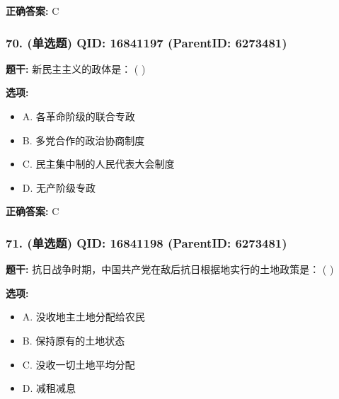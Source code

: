 \documentclass[12pt,UTF8]{ctexart}
\begin{document}
\textbf{正确答案:}
C

\vspace{0.3em}\hrulefill\vspace{0.7em}

\subsubsection*{70. (单选题) \small QID: 16841197 (ParentID: 6273481)}

\textbf{题干:}
新民主主义的政体是： ( )



\textbf{选项:}
\begin{itemize}[leftmargin=*]

  \item A. 各革命阶级的联合专政

  \item B. 多党合作的政治协商制度

  \item C. 民主集中制的人民代表大会制度

  \item D. 无产阶级专政

\end{itemize}

\textbf{正确答案:}
C

\vspace{0.3em}\hrulefill\vspace{0.7em}

\subsubsection*{71. (单选题) \small QID: 16841198 (ParentID: 6273481)}

\textbf{题干:}
抗日战争时期，中国共产党在敌后抗日根据地实行的土地政策是： ( )



\textbf{选项:}
\begin{itemize}[leftmargin=*]

  \item A. 没收地主土地分配给农民

  \item B. 保持原有的土地状态

  \item C. 没收一切土地平均分配

  \item D. 减租减息

\end{itemize}
\end{document}
